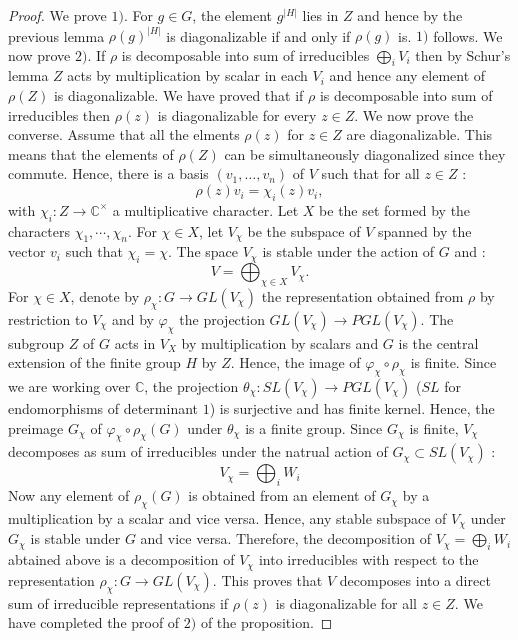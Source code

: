 \documentclass[12pt, reqno]{amsart}
\begin{document}
\begin{proof}
We prove $1)$. For $g\in G$, the element  $g^{\vert H \vert }$ lies in $Z$ and hence by the previous lemma $\rho(g)^{\vert H \vert }$ is diagonalizable if and only if $\rho(g)$ is. $1)$ follows.
We now prove $2)$. If $\rho$ is decomposable into sum of irreducibles $\bigoplus_i V_i$ then by Schur's lemma $Z$ acts by multiplication by scalar in each $V_i$ and hence any element of $\rho(Z)$ is diagonalizable. We have proved that if $\rho$ is decomposable into sum of irreducibles then $\rho(z)$ is diagonalizable for every $z\in Z$. We now prove the converse. Assume that all the elments $\rho(z)$ for $z\in Z$ are diagonalizable. This means that the elements of $\rho(Z)$ can be simultaneously diagonalized since they commute. Hence, there is a basis $(v_1,\dots,v_n)$ of $V$ such that for all $z\in Z$ : 
$$ \rho(z) v_i =\chi_i(z) v_i,$$ 
with $\chi_i :Z \to \mathbb{C}^\times$ a multiplicative character. Let $X$ be the set formed by the characters $\chi_1,\cdots,\chi_n$. For $\chi \in X$, let $V_\chi$ be the subspace of $V$ spanned by the vector $v_i$ such that $\chi_i=\chi$. The space $V_\chi$ is stable under the action of $G$ and :
$$ V= \bigoplus_{\chi\in X} V_{\chi}.$$
For $\chi \in X$, denote by $\rho_\chi : G\to GL(V_\chi)$ the representation obtained from $\rho$ by restriction to $V_\chi$ and by $\varphi_\chi$ the projection $GL(V_\chi)\to PGL(V_\chi)$. The subgroup $Z$ of $G$ acts in $V_X$ by multiplication by scalars and $G$ is the central extension of the finite group $H$ by $Z$. Hence, the image of $\varphi_\chi \circ \rho_\chi$ is finite. Since we are working over $\mathbb{C}$, the projection $\theta_\chi : SL(V_\chi)\to PGL(V_\chi)$ ($SL$ for endomorphisms of determinant $1$) is surjective and has finite kernel. Hence, the preimage $G_\chi$ of $\varphi_\chi \circ \rho_\chi(G)$ under $\theta_\chi$ is a finite group. Since $G_\chi$ is finite, $V_\chi$ decomposes as sum of irreducibles under the natrual action of $G_\chi \subset SL(V_\chi)$ : 
$$V_\chi = \bigoplus_i W_i$$
 Now any element of $\rho_\chi(G)$ is obtained from an element of $G_\chi$ by a multiplication by a scalar and vice versa. Hence, any stable subspace of $V_\chi$ under $G_\chi$ is stable under $G$ and vice versa. Therefore, the decomposition of $V_\chi= \bigoplus_i W_i$ abtained above is a decomposition of $V_\chi$ into irreducibles with respect to the representation $\rho_\chi :G \to GL(V_\chi)$. This proves that $V$ decomposes into a direct sum of irreducible representations if $\rho(z)$ is diagonalizable for all $z\in Z$. We have completed the proof of $2)$ of the proposition.
\end{proof}
\end{document}
